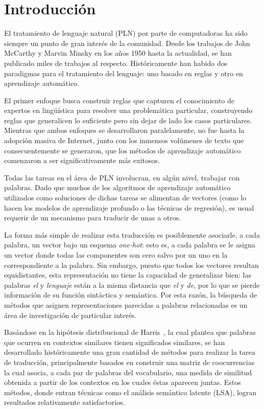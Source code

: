 \chapter{Introducción}

El tratamiento de lenguaje natural (PLN) por parte de computadoras ha sido siempre un punto de gran
interés de la comunidad. Desde los trabajos de John McCarthy y Marvin Minsky en los años 1950 hasta
la actualidad, se han publicado miles de trabajos al respecto. Históricamente han habido dos
paradigmas para el tratamiento del lenguaje: uno basado en reglas y otro en aprendizaje automático.

El primer enfoque busca construir reglas que capturen el conocimiento de expertos en lingüística
para resolver una problemática particular, construyendo reglas que generalicen lo suficiente pero
sin dejar de lado los casos particulares. Mientras que ambos enfoques se desarrollaron
paralelamente, no fue hasta la adopción masiva de Internet, junto con los inmensos volúmenes de
texto que consecuentemente se generaron, que los métodos de aprendizaje automático comenzaron a ser
significativamente más exitosos.

Todas las tareas en el área de PLN involucran, en algún nivel, trabajar con palabras. Dado que
muchos de los algoritmos de aprendizaje automático utilizados como soluciones de dichas tareas se
alimentan de vectores (como lo hacen los modelos de aprendizaje profundo o las técnicas de
regresión), es usual requerir de un mecanismo para traducir de unas a otros.

La forma más simple de realizar esta traducción es posiblemente asociarle, a cada palabra, un vector
bajo un esquema \textit{one-hot}: esto es, a cada palabra se le asigna un vector donde todas las
componentes son cero salvo por un uno en la correspondiente a la palabra. Sin embargo, puesto que
todos los vectores resultan equidistantes, esta representación no tiene la capacidad de generalizar
bien: las palabras \textit{el} y \textit{lenguaje} están a la misma distancia que \textit{el} y
\textit{de}, por lo que se pierde información de su función sintáctica y semántica. Por esta razón,
la búsqueda de métodos que asignen representaciones parecidas a palabras relacionadas es un área de
investigación de particular interés.

Basándose en la hipótesis distribucional de Harris~\cite{Harris1954}, la cual plantea que palabras
que ocurren en contextos similares tienen significados similares, se han desarrollado históricamente
una gran cantidad de métodos para realizar la tarea de traducción, principalmente basados en
construir una matriz de coocurrencias la cual asocia, a cada par de palabras del vocabulario, una
medida de similitud obtenida a partir de los contextos en los cuales éstas aparecen juntas. Estos
métodos, donde entran técnicas como el análisis semántico latente (LSA), logran resultados
relativamente satisfactorios.

